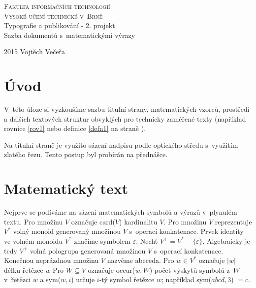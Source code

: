 \documentclass[11pt,a4paper,twocolumn]{article}
\theoremstyle{definition}
\theoremstyle{lemma}
\begin{document}
\begin{titlepage}
  \begin{center}

    \textsc{\Huge Fakulta informačních technologií\\Vysoké učení technické v~Brně}\\
    \LARGE Typografie a publikování - 2. projekt\\Sazba dokumentů
s~matematickými výrazy\\
  \end{center}
  {\Large 2015 \hfill Vojtěch Večeřa}
\end{titlepage}

\section*{Úvod}
\label{uvod}
\noindent V~této úloze si vyzkoušíme sazbu titulní strany, matematických vzorců, prostředí a
dalších textových struktur obvyklých pro technicky zaměřené texty (například rovnice \ref{rov1}
nebo definice \ref{defn1} na straně \pageref{defn1}).

\indent Na titulní straně je využito sázení nadpisu podle optického středu s~využitím zlatého řezu. Tento postup byl probírán na přednášce.

\section{Matematický text}
\label{mattext}
\noindent Nejprve se podíváme na sázení matematických symbolů a výrazů v~plynulém textu. Pro
množinu $V$ označuje card($V$) kardinalitu $V$. Pro množinu $V$ reprezentuje $V^*$ volný monoid
generovaný množinou $V$ s~operací konkatenace.
Prvek identity ve volném monoidu $V^*$ značíme symbolem $\varepsilon$.
Nechť $V^+ =V^*-\{\varepsilon\}$. Algebraicky je tedy $V^+$ volná pologrupa generovaná množinou
$V$ s~operací konkatenace. Konečnou neprázdnou množinu $V$ nazvěme abeceda.
Pro $w \in V^*$ označuje $|w|$ délku řetězce $w$ Pro $W \subseteq V$ označuje occur($w, W$) počet
výskytů symbolů z~$W$ v~řetězci $w$ a sym($w, i$) určuje $i$-tý symbol řetězce $w$; například
sym($abcd, 3$) $= c$.
\end{document}
